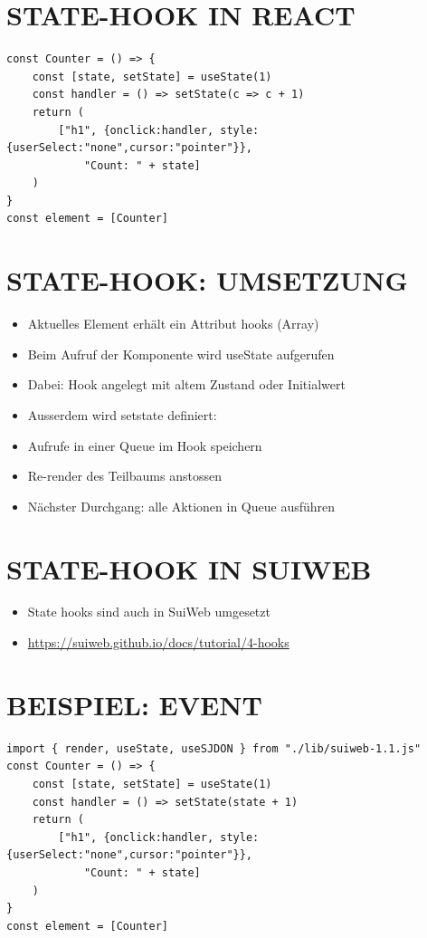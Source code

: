 \documentclass[10pt]{article}
\begin{document}
\section*{STATE-HOOK IN REACT}
\begin{verbatim}
const Counter = () => {
    const [state, setState] = useState(1)
    const handler = () => setState(c => c + 1)
    return (
        ["h1", {onclick:handler, style:{userSelect:"none",cursor:"pointer"}},
            "Count: " + state]
    )
}
const element = [Counter]
\end{verbatim}

\section*{STATE-HOOK: UMSETZUNG}
\begin{itemize}
  \item Aktuelles Element erhält ein Attribut hooks (Array)
  \item Beim Aufruf der Komponente wird useState aufgerufen
  \item Dabei: Hook angelegt mit altem Zustand oder Initialwert
  \item Ausserdem wird setstate definiert:
  \item Aufrufe in einer Queue im Hook speichern
  \item Re-render des Teilbaums anstossen
  \item Nächster Durchgang: alle Aktionen in Queue ausführen
\end{itemize}

\section*{STATE-HOOK IN SUIWEB}
\begin{itemize}
  \item State hooks sind auch in SuiWeb umgesetzt
  \item \href{https://suiweb.github.io/docs/tutorial/4-hooks}{https://suiweb.github.io/docs/tutorial/4-hooks}
\end{itemize}

\section*{BEISPIEL: EVENT}
\begin{verbatim}
import { render, useState, useSJDON } from "./lib/suiweb-1.1.js"
const Counter = () => {
    const [state, setState] = useState(1)
    const handler = () => setState(state + 1)
    return (
        ["h1", {onclick:handler, style:{userSelect:"none",cursor:"pointer"}},
            "Count: " + state]
    )
}
const element = [Counter]
\end{verbatim}
\end{document}
